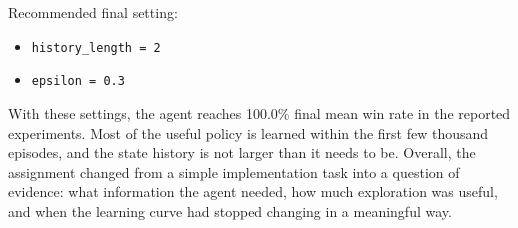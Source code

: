 \documentclass[11pt,a4paper]{article}
\begin{document}
Recommended final setting:

\begin{itemize}[leftmargin=1.5em]
  \item \texttt{history\_length = 2}
  \item \texttt{epsilon = 0.3}
\end{itemize}

With these settings, the agent reaches 100.0\% final mean win rate in the reported experiments. Most of the useful policy is learned within the first few thousand episodes, and the state history is not larger than it needs to be. Overall, the assignment changed from a simple implementation task into a question of evidence: what information the agent needed, how much exploration was useful, and when the learning curve had stopped changing in a meaningful way.
\end{document}
